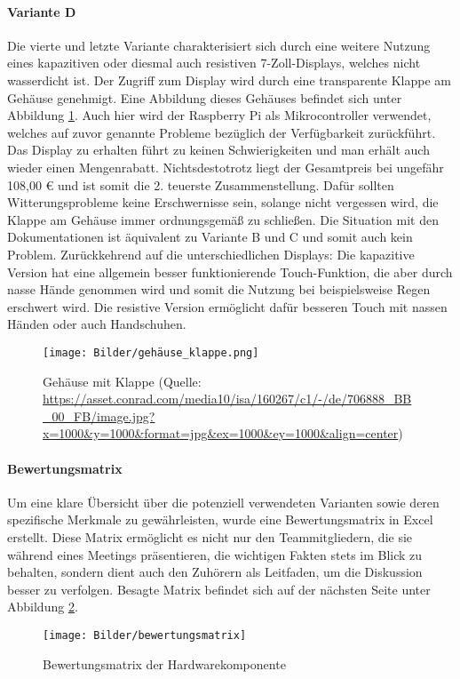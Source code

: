 \paragraph{Variante D}
Die vierte und letzte Variante charakterisiert sich durch eine weitere Nutzung eines kapazitiven oder diesmal auch resistiven 7-Zoll-Displays, welches nicht wasserdicht ist. Der Zugriff zum Display wird durch eine transparente Klappe am Gehäuse genehmigt. Eine Abbildung dieses Gehäuses befindet sich unter Abbildung \ref{fig:gehäuse_mit_klappe}. Auch hier wird der Raspberry Pi als Mikrocontroller verwendet, welches auf zuvor genannte Probleme bezüglich der Verfügbarkeit zurückführt. Das Display zu erhalten führt zu keinen Schwierigkeiten und man erhält auch wieder einen Mengenrabatt. Nichtsdestotrotz liegt der Gesamtpreis bei ungefähr 108,00 € und ist somit die 2. teuerste Zusammenstellung. Dafür sollten Witterungsprobleme keine Erschwernisse sein, solange nicht vergessen wird, die Klappe am Gehäuse immer ordnungsgemäß zu schließen. Die Situation mit den Dokumentationen ist äquivalent zu Variante B und C und somit auch kein Problem. Zurückkehrend auf die unterschiedlichen Displays: Die kapazitive Version hat eine allgemein besser funktionierende Touch-Funktion, die aber durch nasse Hände genommen wird und somit die Nutzung bei beispielsweise Regen erschwert wird. Die resistive Version ermöglicht dafür besseren Touch mit nassen Händen oder auch Handschuhen.
\begin{figure}[ht]
	\centering
	\texttt{[image: Bilder/gehäuse\_klappe.png]}
	\caption{Gehäuse mit Klappe (Quelle: \url{https://asset.conrad.com/media10/isa/160267/c1/-/de/706888_BB_00_FB/image.jpg?x=1000&y=1000&format=jpg&ex=1000&ey=1000&align=center})}
	\label{fig:gehäuse_mit_klappe}
\end{figure}
\newpage
\paragraph{Bewertungsmatrix}
Um eine klare Übersicht über die potenziell verwendeten Varianten sowie deren spezifische Merkmale zu gewährleisten, wurde eine Bewertungsmatrix in Excel erstellt. Diese Matrix ermöglicht es nicht nur den Teammitgliedern, die sie während eines Meetings präsentieren, die wichtigen Fakten stets im Blick zu behalten, sondern dient auch den Zuhörern als Leitfaden, um die Diskussion besser zu verfolgen. Besagte Matrix befindet sich auf der nächsten Seite unter Abbildung \ref{fig:matrix}.
\begin{landscape}
	\begin{figure}[H]
		\centering
		\texttt{[image: Bilder/bewertungsmatrix]}
		\caption{Bewertungsmatrix der Hardwarekomponente}
		\label{fig:matrix}
	\end{figure}
\end{landscape}